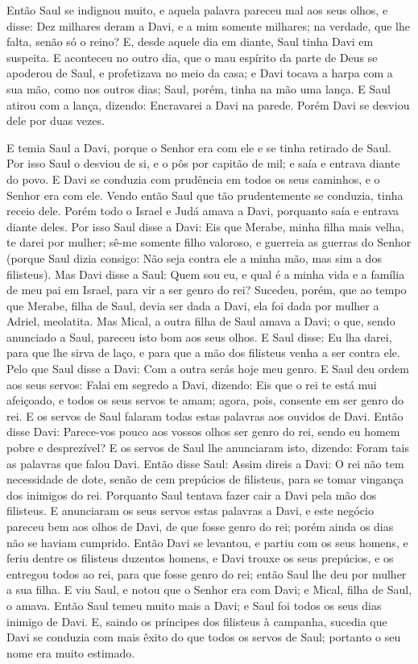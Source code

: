 Então Saul se indignou muito, e aquela palavra pareceu mal aos
seus olhos, e disse: Dez milhares deram a Davi, e a mim somente
milhares; na verdade, que lhe falta, senão só o reino? E, desde
aquele dia em diante, Saul tinha Davi em suspeita. E
aconteceu no outro dia, que o mau espírito da parte de Deus se
apoderou de Saul, e profetizava no meio da casa; e Davi tocava a
harpa com a sua mão, como nos outros dias; Saul, porém, tinha na mão
uma lança. E Saul atirou com a lança, dizendo: Encravarei a
Davi na parede. Porém Davi se desviou dele por duas vezes.

E temia Saul a Davi, porque o Senhor era com ele e se tinha
retirado de Saul. Por isso Saul o desviou de si, e o pôs por
capitão de mil; e saía e entrava diante do povo. E Davi se
conduzia com prudência em todos os seus caminhos, e o Senhor era com
ele. Vendo então Saul que tão prudentemente se conduzia,
tinha receio dele. Porém todo o Israel e Judá amava a Davi,
porquanto saía e entrava diante deles. Por isso Saul disse a
Davi: Eis que Merabe, minha filha mais velha, te darei por mulher;
sê-me somente filho valoroso, e guerreia as guerras do Senhor
(porque Saul dizia consigo: Não seja contra ele a minha mão, mas sim
a dos filisteus). Mas Davi disse a Saul: Quem sou eu, e qual
é a minha vida e a família de meu pai em Israel, para vir a ser
genro do rei? Sucedeu, porém, que ao tempo que Merabe, filha
de Saul, devia ser dada a Davi, ela foi dada por mulher a Adriel,
meolatita. Mas Mical, a outra filha de Saul amava a Davi; o
que, sendo anunciado a Saul, pareceu isto bom aos seus olhos.
E Saul disse: Eu lha darei, para que lhe sirva de laço, e
para que a mão dos filisteus venha a ser contra ele. Pelo que Saul
disse a Davi: Com a outra serás hoje meu genro. E Saul deu
ordem aos seus servos: Falai em segredo a Davi, dizendo: Eis que o
rei te está mui afeiçoado, e todos os seus servos te amam; agora,
pois, consente em ser genro do rei. E os servos de Saul
falaram todas estas palavras aos ouvidos de Davi. Então disse Davi:
Parece-vos pouco aos vossos olhos ser genro do rei, sendo eu homem
pobre e desprezível? E os servos de Saul lhe anunciaram isto,
dizendo: Foram tais as palavras que falou Davi. Então disse
Saul: Assim direis a Davi: O rei não tem necessidade de dote, senão
de cem prepúcios de filisteus, para se tomar vingança dos inimigos
do rei. Porquanto Saul tentava fazer cair a Davi pela mão dos
filisteus. E anunciaram os seus servos estas palavras a Davi,
e este negócio pareceu bem aos olhos de Davi, de que fosse genro do
rei; porém ainda os dias não se haviam cumprido. Então Davi
se levantou, e partiu com os seus homens, e feriu dentre os
filisteus duzentos homens, e Davi trouxe os seus prepúcios, e os
entregou todos ao rei, para que fosse genro do rei; então Saul lhe
deu por mulher a sua filha. E viu Saul, e notou que o Senhor
era com Davi; e Mical, filha de Saul, o amava. Então Saul
temeu muito mais a Davi; e Saul foi todos os seus dias inimigo de
Davi. E, saindo os príncipes dos filisteus à campanha,
sucedia que Davi se conduzia com mais êxito do que todos os servos
de Saul; portanto o seu nome era muito estimado.

